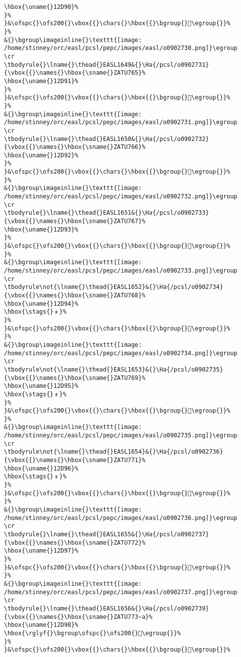 \begin{verbatim}
\hbox{\uname{}12D90}%
}%
}&\ofspc{}\ofs200{}\vbox{{}\chars{}\hbox{{}\bgroup{}𒶐\egroup{}}%
}%
&{}\bgroup\imageinline{}\texttt{[image: /home/stinney/orc/easl/pcsl/pepc/images/easl/o0902730.png]}\egroup
\cr
\tbodyrule{}\lname{}\thead{}EASL1649&{}\Ha{/pcsl/o0902731}{\vbox{{}\names{}\hbox{\sname{}ZATU765}%
\hbox{\uname{}12D91}%
}%
}&\ofspc{}\ofs200{}\vbox{{}\chars{}\hbox{{}\bgroup{}𒶑\egroup{}}%
}%
&{}\bgroup\imageinline{}\texttt{[image: /home/stinney/orc/easl/pcsl/pepc/images/easl/o0902731.png]}\egroup
\cr
\tbodyrule{}\lname{}\thead{}EASL1650&{}\Ha{/pcsl/o0902732}{\vbox{{}\names{}\hbox{\sname{}ZATU766}%
\hbox{\uname{}12D92}%
}%
}&\ofspc{}\ofs200{}\vbox{{}\chars{}\hbox{{}\bgroup{}𒶒\egroup{}}%
}%
&{}\bgroup\imageinline{}\texttt{[image: /home/stinney/orc/easl/pcsl/pepc/images/easl/o0902732.png]}\egroup
\cr
\tbodyrule{}\lname{}\thead{}EASL1651&{}\Ha{/pcsl/o0902733}{\vbox{{}\names{}\hbox{\sname{}ZATU767}%
\hbox{\uname{}12D93}%
}%
}&\ofspc{}\ofs200{}\vbox{{}\chars{}\hbox{{}\bgroup{}𒶓\egroup{}}%
}%
&{}\bgroup\imageinline{}\texttt{[image: /home/stinney/orc/easl/pcsl/pepc/images/easl/o0902733.png]}\egroup
\cr
\tbodyrule\not{\lname{}\thead{}EASL1652}&{}\Ha{/pcsl/o0902734}{\vbox{{}\names{}\hbox{\sname{}ZATU768}%
\hbox{\uname{}12D94}%
\hbox{\stags{}﹟}%
}%
}&\ofspc{}\ofs200{}\vbox{{}\chars{}\hbox{{}\bgroup{}𒶔\egroup{}}%
}%
&{}\bgroup\imageinline{}\texttt{[image: /home/stinney/orc/easl/pcsl/pepc/images/easl/o0902734.png]}\egroup
\cr
\tbodyrule\not{\lname{}\thead{}EASL1653}&{}\Ha{/pcsl/o0902735}{\vbox{{}\names{}\hbox{\sname{}ZATU769}%
\hbox{\uname{}12D95}%
\hbox{\stags{}﹟}%
}%
}&\ofspc{}\ofs200{}\vbox{{}\chars{}\hbox{{}\bgroup{}𒶕\egroup{}}%
}%
&{}\bgroup\imageinline{}\texttt{[image: /home/stinney/orc/easl/pcsl/pepc/images/easl/o0902735.png]}\egroup
\cr
\tbodyrule\not{\lname{}\thead{}EASL1654}&{}\Ha{/pcsl/o0902736}{\vbox{{}\names{}\hbox{\sname{}ZATU771}%
\hbox{\uname{}12D96}%
\hbox{\stags{}﹟}%
}%
}&\ofspc{}\ofs200{}\vbox{{}\chars{}\hbox{{}\bgroup{}𒶖\egroup{}}%
}%
&{}\bgroup\imageinline{}\texttt{[image: /home/stinney/orc/easl/pcsl/pepc/images/easl/o0902736.png]}\egroup
\cr
\tbodyrule{}\lname{}\thead{}EASL1655&{}\Ha{/pcsl/o0902737}{\vbox{{}\names{}\hbox{\sname{}ZATU772}%
\hbox{\uname{}12D97}%
}%
}&\ofspc{}\ofs200{}\vbox{{}\chars{}\hbox{{}\bgroup{}𒶗\egroup{}}%
}%
&{}\bgroup\imageinline{}\texttt{[image: /home/stinney/orc/easl/pcsl/pepc/images/easl/o0902737.png]}\egroup
\cr
\tbodyrule{}\lname{}\thead{}EASL1656&{}\Ha{/pcsl/o0902739}{\vbox{{}\names{}\hbox{\sname{}ZATU773∼a}%
\hbox{\uname{}12D98}%
\hbox{\rglyf{}\bgroup\ofspc{}\ofs200{}𒶘\egroup{}}%
}%
}&\ofspc{}\ofs200{}\vbox{{}\chars{}\hbox{{}\bgroup{}𒶘\egroup{}}%

\end{verbatim}
